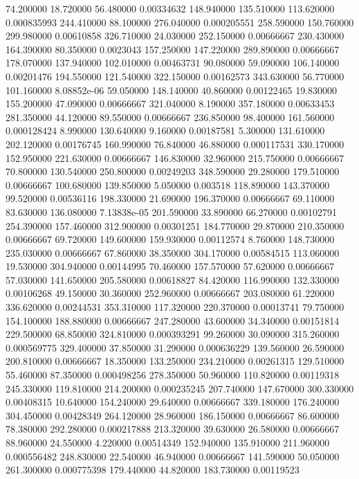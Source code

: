 74.200000	18.720000	56.480000	0.00334632
148.940000	135.510000	113.620000	0.000835993
244.410000	88.100000	276.040000	0.000205551
258.590000	150.760000	299.980000	0.00610858
326.710000	24.030000	252.150000	0.00666667
230.430000	164.390000	80.350000	0.0023043
157.250000	147.220000	289.890000	0.00666667
178.070000	137.940000	102.010000	0.00463731
90.080000	59.090000	106.140000	0.00201476
194.550000	121.540000	322.150000	0.00162573
343.630000	56.770000	101.160000	8.08852e-06
59.050000	148.140000	40.860000	0.00122465
19.830000	155.200000	47.090000	0.00666667
321.040000	8.190000	357.180000	0.00633453
281.350000	44.120000	89.550000	0.00666667
236.850000	98.400000	161.560000	0.000128424
8.990000	130.640000	9.160000	0.00187581
5.300000	131.610000	202.120000	0.00176745
160.990000	76.840000	46.880000	0.000117531
330.170000	152.950000	221.630000	0.00666667
146.830000	32.960000	215.750000	0.00666667
70.800000	130.540000	250.800000	0.00249203
348.590000	29.280000	179.510000	0.00666667
100.680000	139.850000	5.050000	0.003518
118.890000	143.370000	99.520000	0.00536116
198.330000	21.690000	196.370000	0.00666667
69.110000	83.630000	136.080000	7.13838e-05
201.590000	33.890000	66.270000	0.00102791
254.390000	157.460000	312.900000	0.00301251
184.770000	29.870000	210.350000	0.00666667
69.720000	149.600000	159.930000	0.00112574
8.760000	148.730000	235.030000	0.00666667
67.860000	38.350000	304.170000	0.00584515
113.060000	19.530000	304.940000	0.00144995
70.460000	157.570000	57.620000	0.00666667
57.030000	141.650000	205.580000	0.00618827
84.420000	116.990000	132.330000	0.00106268
49.150000	30.360000	252.960000	0.00666667
203.080000	61.220000	336.620000	0.00244531
353.310000	117.320000	220.370000	0.00013741
79.750000	154.100000	188.880000	0.00666667
247.280000	43.600000	34.340000	0.00151814
229.500000	68.850000	324.810000	0.000393291
99.260000	30.090000	315.260000	0.000569775
329.400000	37.850000	31.290000	0.000636229
139.560000	26.590000	200.810000	0.00666667
18.350000	133.250000	234.210000	0.00261315
129.510000	55.460000	87.350000	0.000498256
278.350000	50.960000	110.820000	0.00119318
245.330000	119.810000	214.200000	0.000235245
207.740000	147.670000	300.330000	0.00408315
10.640000	154.240000	29.640000	0.00666667
339.180000	176.240000	304.450000	0.00428349
264.120000	28.960000	186.150000	0.00666667
86.600000	78.380000	292.280000	0.000217888
213.320000	39.630000	26.580000	0.00666667
88.960000	24.550000	4.220000	0.00514349
152.940000	135.910000	211.960000	0.000556482
248.830000	22.540000	46.940000	0.00666667
141.590000	50.050000	261.300000	0.000775398
179.440000	44.820000	183.730000	0.00119523
